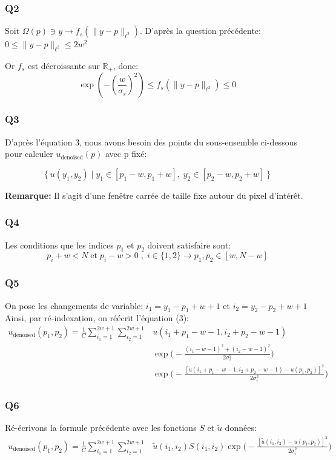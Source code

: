 \documentclass{article}
\begin{document}
\subsubsection*{Q2}
Soit $\Omega(p) \ni y \rightarrow f_s(\parallel y-p \parallel_{\ell^2})$. 
D'après la question précédente: $ 0 \leq \parallel y-p \parallel_{\ell^2} \leq 2 w^2 $

Or $f_s$ est décroissante sur $\mathbb{R}_+$, donc: $$\exp(-(\frac{w}{\sigma_s})^2) \leq f_s(\parallel y-p \parallel_{\ell^2}) \leq 0 $$

\subsubsection*{Q3} D'après l'équation 3, nous avons besoin des points du sous-ensemble ci-dessous pour calculer $u_\text{denoised}(p)$ avec p fixé: 

$$\big \{ \: u(y_1, y_2) \;|\; y_1 \in {[p_1 - w, p_1 + w]}, \; y_2 \in {[p_2 - w, p_2 + w]}\: \big \}  $$

\textbf{Remarque: } Il s'agit d'une fenêtre carrée de taille fixe autour du pixel d'intérêt.
\subsubsection*{Q4}
Les conditions que les indices $p_1$ et $p_2$ doivent satisfaire sont:
 $$p_i + w < N \;\text{et}\; p_i - w > 0 \;,\; i \in \{1, 2\} \rightarrow p_1, p_2 \in {[w, N-w]}$$
\subsubsection*{Q5}
On pose les changements de variable: $i_1 = y_1 - p_1 + w + 1$ et $i_2 = y_2 - p_2 + w + 1$
Ainsi, par ré-indexation, on réécrit l'équation (3):
\begin{equation*}\begin{split}
u_\text{denoised}(p_1, p_2) = \frac{1}{C} \displaystyle\sum_{i_1 = 1}^{2w + 1}
\displaystyle\sum_{i_2 = 1}^{2w + 1} & u(i_1+p_1 - w - 1, i_2 + p_2 - w - 1) \\
& \exp{ \big ( - \frac{(i_1 - w - 1)^2 + (i_2 -w -1)^2 }{2\sigma_s^2} \big )} \\
& \exp{ \big ( - \frac{[u(i_1 + p_1 - w - 1, i_2 + p_2 - w - 1) - u(p_1, p_2)]^2}{2\sigma_i^2} \big )}
\end{split}\end{equation*}

\subsubsection*{Q6}
Ré-écrivons la formule précédente avec les fonctions $S$ et $\tilde{u}$ données:
\begin{equation*}\begin{split}
u_\text{denoised}(p_1, p_2) = \frac{1}{C} \displaystyle\sum_{i_1 = 1}^{2w + 1}
\displaystyle\sum_{i_2 = 1}^{2w + 1} & \tilde{u}(i_1, i_2) S(i_1,i_2) \exp{ \big ( - \frac{[\tilde{u}(i_1, i_2) - u(p_1, p_2)]^2}{2\sigma_i^2} \big )}
\end{split}\end{equation*}
\end{document}
